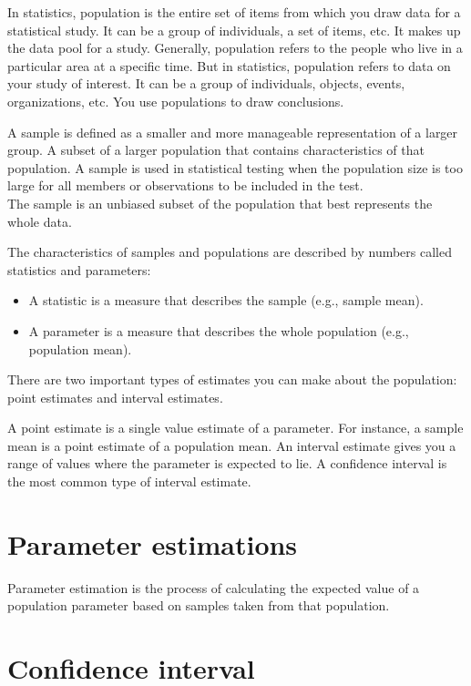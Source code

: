 \documentclass[
]{book}
\providecommand{\tightlist}{%
  \setlength{\itemsep}{0pt}\setlength{\parskip}{0pt}}
\begin{document}
In statistics, population is the entire set of items from which you draw data for a statistical study. It can be a group of individuals, a set of items, etc. It makes up the data pool for a study. Generally, population refers to the people who live in a particular area at a specific time. But in statistics, population refers to data on your study of interest. It can be a group of individuals, objects, events, organizations, etc. You use populations to draw conclusions.

A sample is defined as a smaller and more manageable representation of a larger group. A subset of a larger population that contains characteristics of that population. A sample is used in statistical testing when the population size is too large for all members or observations to be included in the test.\\
The sample is an unbiased subset of the population that best represents the whole data.

The characteristics of samples and populations are described by numbers called statistics and parameters:

\begin{itemize}
\tightlist
\item
  A statistic is a measure that describes the sample (e.g., sample mean).
\item
  A parameter is a measure that describes the whole population (e.g., population mean).
\end{itemize}

There are two important types of estimates you can make about the population: point estimates and interval estimates.

A point estimate is a single value estimate of a parameter. For instance, a sample mean is a point estimate of a population mean.
An interval estimate gives you a range of values where the parameter is expected to lie. A confidence interval is the most common type of interval estimate.

\hypertarget{parameter-estimations}{%
\section{Parameter estimations}\label{parameter-estimations}}

Parameter estimation is the process of calculating the expected value of a population parameter based on samples taken from that population.

\hypertarget{confidence-interval}{%
\section{Confidence interval}\label{confidence-interval}}
\end{document}
